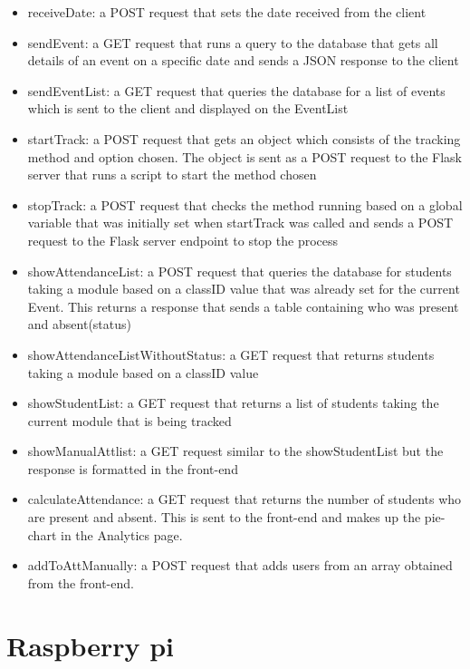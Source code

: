 \begin{itemize}
  \item receiveDate: a POST request that sets the date received from the client
  \item sendEvent: a GET request that runs a query to the database that gets all details of an event on a specific date and sends a \gls{JSON} response to the client
  \item sendEventList: a GET request that queries the database for a list of events which is sent to the client and displayed on the EventList
  \item startTrack: a POST request that gets an object which consists of the tracking method and option chosen. The object is sent as a POST request to the Flask server that runs a script to start the method chosen
  \item stopTrack: a POST request that checks the method running based on a global variable that was initially set when startTrack was called and sends a POST request to the Flask server endpoint to stop the process
  \item showAttendanceList: a POST request that queries the database for students taking a module based on a classID value that was already set for the current Event. This returns a response that sends a table containing who was present and absent(status)
  \item showAttendanceListWithoutStatus: a GET request that returns students taking a module based on a classID value
  \item showStudentList: a GET request that returns a list of students taking the current module that is being tracked
  \item showManualAttlist: a GET request similar to the showStudentList but the response is formatted in the front-end
  \item calculateAttendance: a GET request that returns the number of students who are present and absent. This is sent to the front-end and makes up the pie-chart in the Analytics page.
  \item addToAttManually: a POST request that adds users from an array obtained from the front-end.
\end{itemize}
 
\section{Raspberry pi}
